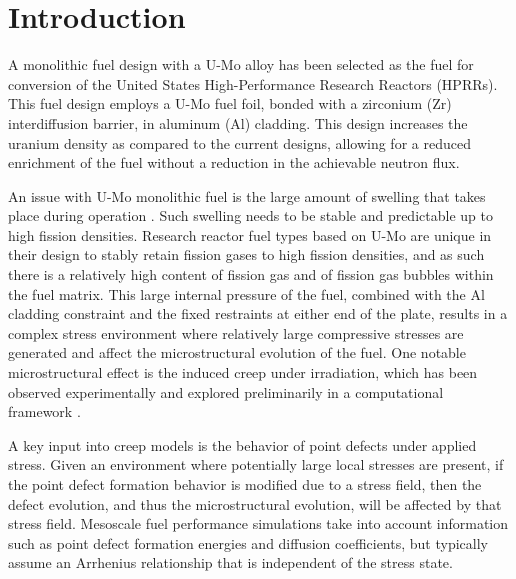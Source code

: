 \documentclass[default]{sn-jnl}%
\begin{document}
\section{Introduction}\label{sec1}

A monolithic fuel design with a U-Mo alloy has been selected as the fuel for conversion of the United States High-Performance Research Reactors (HPRRs). This fuel design employs a U-Mo fuel foil, bonded with a zirconium (Zr) interdiffusion barrier, in aluminum (Al) cladding. This design increases the uranium density as compared to the current designs, allowing for a reduced enrichment of the fuel without a reduction in the achievable neutron flux. 

An issue with U-Mo monolithic fuel is the large amount of swelling that takes place during operation \cite{hofman1997}. Such swelling needs to be stable and predictable up to high fission densities. Research reactor fuel types based on U-Mo are unique in their design to stably retain fission gases to high fission densities, and as such there is a relatively high content of fission gas and of fission gas bubbles within the fuel matrix. This large internal pressure of the fuel, combined with the Al cladding constraint and the fixed restraints at either end of the plate, results in a complex stress environment where relatively large compressive stresses are generated and affect the microstructural evolution of the fuel. One notable microstructural effect is the induced creep under irradiation, which has been observed experimentally \cite{kim2013} and explored preliminarily in a computational framework \cite{xmiao2021, xjian2019}. 

A key input into creep models is the behavior of point defects under applied stress. Given an environment where potentially large local stresses are present, if the point defect formation behavior is modified due to a stress field, then the defect evolution, and thus the microstructural evolution, will be affected by that stress field. Mesoscale fuel performance simulations \cite{ye2018, hu2017a} take into account information such as point defect formation energies and diffusion coefficients, but typically assume an Arrhenius relationship that is independent of the stress state. 
\end{document}
